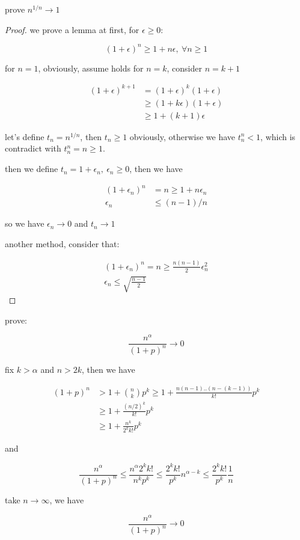 \begin{exercise}
    prove $n^{1/n} \to 1$
\end{exercise}

\begin{proof}
    we prove a lemma at first, for $\epsilon \ge 0$:

    \[
        (1+\epsilon)^n \ge 1 + n\epsilon,\: \forall n \ge 1
    \]

    for $n =1$, obviously, assume holds for $n = k$, consider $n=k+1$

    \begin{align*}
        (1+\epsilon)^{k+1} & =(1+\epsilon)^k (1 + \epsilon)  \\
        & \ge (1+ k\epsilon)(1 + \epsilon) \\
        & \ge  1+ (k+1) \epsilon
    \end{align*}

    let's define $t_n = n^{1/n}$, then $t_n \ge 1$ obviously, otherwise we have $t_n^n < 1$, which is contradict with $t_n^n = n \ge 1$.

    then we define $t_n = 1 + \epsilon_n,\: \epsilon_n \ge 0$, then we have

    \begin{align*}
        (1+\epsilon_n)^n &= n \ge 1 + n \epsilon_n \\
        \epsilon_n &\le (n-1)/n
    \end{align*}

    so we have $\epsilon_n \to 0$ and $t_n \to 1$
    
    another method, consider that:

    \begin{align*}
        (1+\epsilon_n)^n = n \ge \frac{n(n-1)}{2}\epsilon_n^2 \\
        \epsilon_n \le \sqrt{\frac{n-1}{2}}
    \end{align*}
\end{proof}

\begin{exercise}
    prove:

    \[
        \frac{n^{\alpha}}{(1+p)^n} \to 0
    \]

    fix $k > \alpha$ and $n > 2k$, then we have

    \begin{align*}
        (1+p)^n &> 1 + \binom{n}{k}p^k \ge 1 + \frac{n(n-1)..(n-(k-1))}{k!}p^k \\
        & \ge 1 + \frac{(n/2 )^k}{k!}p^k \\
        & \ge 1 + \frac{n^k}{2^k k!}p^k
    \end{align*}

    and 

    \[
        \frac{n^\alpha}{(1+p)^n} \le \frac{n^{\alpha} 2^k k!}{n^kp^k} \le \frac{2^k k!}{p^k} n^{\alpha - k} \le  \frac{2^k k!}{p^k} \frac{1}{n}
    \]

    take $n \to \infty$, we have

    \[
        \frac{n^\alpha}{(1+p)^n} \to 0
    \]
\end{exercise}

